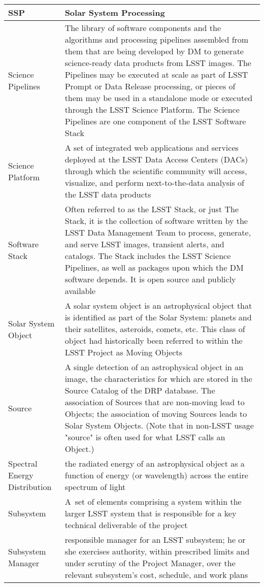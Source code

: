 \begin{longtable}{|p{}|p{}|}
SSP & Solar System Processing \\\hline
Science Pipelines & The library of software components and the algorithms and processing pipelines assembled from them that are being developed by \gls{DM} to generate science-ready data products from \gls{LSST} images. The Pipelines may be executed at scale as part of \gls{LSST} Prompt or \gls{Data Release} processing, or pieces of them may be used in a standalone mode or executed through the \gls{LSST} \gls{Science Platform}. The \gls{Science Pipelines} are one component of the \gls{LSST} \gls{Software Stack} \\\hline
Science Platform & A set of integrated web applications and services deployed at the \gls{LSST} Data Access Centers (DACs) through which the scientific community will access, visualize, and perform next-to-the-data analysis of the \gls{LSST} data products \\\hline
Software Stack & Often referred to as the \gls{LSST} Stack, or just The Stack, it is the collection of software written by the \gls{LSST} \gls{Data Management} Team to process, generate, and serve \gls{LSST} images, \gls{transient} alerts, and catalogs. The Stack includes the \gls{LSST} \gls{Science Pipelines}, as well as packages upon which the \gls{DM} software depends. It is open source and publicly available \\\hline
Solar System \gls{Object} & A solar system object is an astrophysical object that is identified as part of the Solar System: planets and their satellites, asteroids, comets, etc. This class of object had historically been referred to within the \gls{LSST} Project as Moving Objects \\\hline
Source & A single detection of an astrophysical object in an image, the characteristics for which are stored in the \gls{Source} Catalog of the \gls{DRP} database. The association of Sources that are non-moving lead to Objects; the association of moving Sources leads to Solar System Objects. (Note that in non-LSST usage "source" is often used for what \gls{LSST} calls an \gls{Object}.) \\\hline
Spectral Energy Distribution & the radiated energy of an astrophysical object as a function of energy (or wavelength) across the entire spectrum of light \\\hline
Subsystem & A set of elements comprising a system within the larger \gls{LSST} system that is responsible for a key technical deliverable of the project \\\hline
Subsystem Manager & responsible manager for an LSST subsystem; he or she exercises authority, within prescribed limits and under scrutiny of the Project Manager, over the relevant subsystem's cost, schedule, and work plans \\\hline

\end{longtable}

